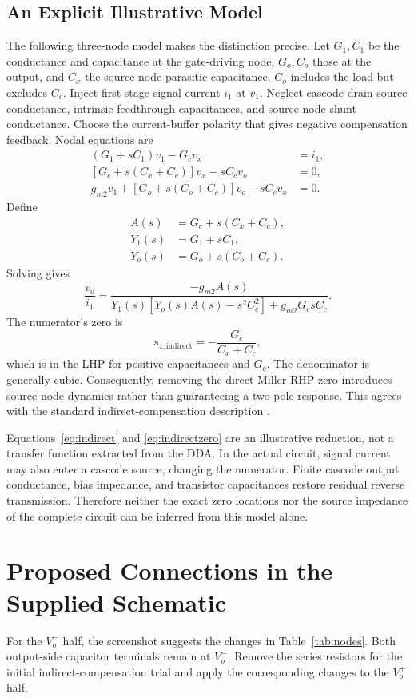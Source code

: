 \documentclass[10pt,journal]{IEEEtran}
\newcommand{\gm}{g_{m2}}
\newcommand{\Gc}{G_c}
\begin{document}
\subsection{An Explicit Illustrative Model}
The following three-node model makes the distinction precise. Let $G_1,C_1$ be the conductance and capacitance at the gate-driving node, $G_o,C_o$ those at the output, and $C_x$ the source-node parasitic capacitance. $C_o$ includes the load but excludes $C_c$. Inject first-stage signal current $i_1$ at $v_1$. Neglect cascode drain-source conductance, intrinsic feedthrough capacitances, and source-node shunt conductance. Choose the current-buffer polarity that gives negative compensation feedback. Nodal equations are
\begin{align}
 (G_1+sC_1)v_1-\Gc v_x &= i_1,\\
 [\Gc+s(C_x+C_c)]v_x-sC_c v_o &=0,\\
 \gm v_1+[G_o+s(C_o+C_c)]v_o-sC_c v_x &=0.
\end{align}
Define
\begin{align}
 A(s)&=\Gc+s(C_x+C_c),\\
 Y_1(s)&=G_1+sC_1,\\
 Y_o(s)&=G_o+s(C_o+C_c).
\end{align}
Solving gives
\begin{equation}
 \frac{v_o}{i_1}=
 \frac{-\gm A(s)}
 {Y_1(s)[Y_o(s)A(s)-s^2C_c^2]+\gm\Gc sC_c}.
 \label{eq:indirect}
\end{equation}
The numerator's zero is
\begin{equation}
 s_{z,\mathrm{indirect}}=-\frac{\Gc}{C_x+C_c},
 \label{eq:indirectzero}
\end{equation}
which is in the LHP for positive capacitances and $\Gc$. The denominator is generally cubic. Consequently, removing the direct Miller RHP zero introduces source-node dynamics rather than guaranteeing a two-pole response. This agrees with the standard indirect-compensation description \cite{saxena2008}.

Equations~\eqref{eq:indirect} and \eqref{eq:indirectzero} are an illustrative reduction, not a transfer function extracted from the DDA. In the actual circuit, signal current may also enter a cascode source, changing the numerator. Finite cascode output conductance, bias impedance, and transistor capacitances restore residual reverse transmission. Therefore neither the exact zero locations nor the source impedance of the complete circuit can be inferred from this model alone.

\section{Proposed Connections in the Supplied Schematic}
For the $V_o^-$ half, the screenshot suggests the changes in Table~\ref{tab:nodes}. Both output-side capacitor terminals remain at $V_o^-$. Remove the series resistors for the initial indirect-compensation trial and apply the corresponding changes to the $V_o^+$ half.
\end{document}

